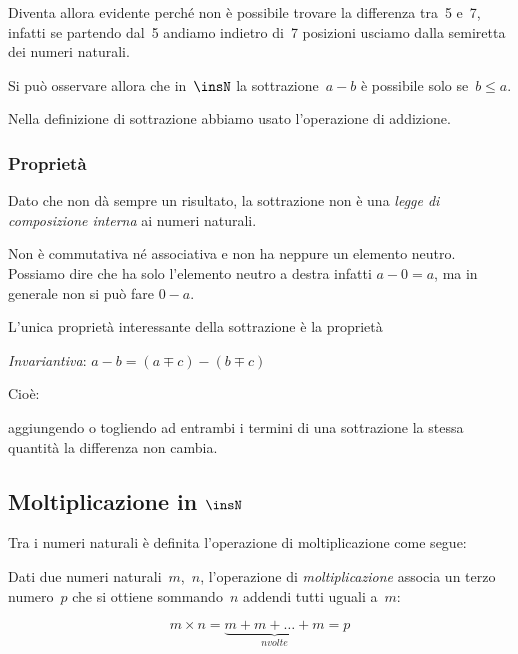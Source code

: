 Diventa allora evidente perché non è possibile trovare la differenza 
tra~5 e~7, infatti se partendo dal~5 andiamo indietro di~7 posizioni 
usciamo dalla semiretta dei numeri naturali.

\begin{inaccessibleblock}

\end{inaccessibleblock}

Si può osservare allora che in~\(\insN\) la sottrazione~\(a - b\) è possibile 
solo se~\(b\leq a\).

\osservazione Nella definizione di sottrazione abbiamo usato l'operazione 
di addizione.

\subsubsection{Proprietà}

Dato che non dà sempre un risultato, la sottrazione non è una 
\emph{legge di composizione interna} ai numeri naturali. 

Non è commutativa né associativa e non ha neppure un elemento neutro.
Possiamo dire che ha solo l'elemento neutro a destra infatti \(a - 0 = a\), 
ma in generale non si può fare \(0 - a\).

L'unica proprietà interessante della sottrazione è la proprietà 
\begin{itemize*}
 \item \emph{Invariantiva}: \(a - b = (a \mp c) - (b \mp c)\)
\end{itemize*}

Cioè: 
\begin{definizione}
aggiungendo o togliendo ad entrambi i termini di una sottrazione 
la stessa quantità la differenza non  cambia.
\end{definizione}

\subsection{Moltiplicazione in \(\insN\)}

Tra i numeri naturali è definita l'operazione di moltiplicazione come segue:

\begin{definizione}
Dati due numeri naturali~\(m\),~\(n\), l'operazione di \emph{moltiplicazione} 
associa un terzo numero~\(p\) che si ottiene sommando~\(n\) addendi tutti 
uguali a~\(m\):

\begin{inaccessibleblock}[
\[m \times n = \mbox{n volte}{(m + m + \dots + m)} = p\]
]
\[m \times n = \underbrace{m + m + \dots + m}_{n volte} = p\]
\end{inaccessibleblock}
\end{definizione}

